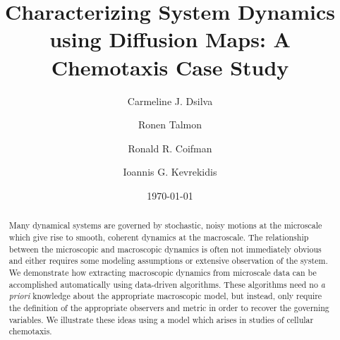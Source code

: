 \documentclass[prl, reprint, final, showkeys]{revtex4-1}
\begin{document}
\title{Characterizing System Dynamics using Diffusion Maps: A Chemotaxis Case Study}

\author{Carmeline J. Dsilva}

\author{Ronen Talmon}

\author{Ronald R. Coifman}

\author{Ioannis G. Kevrekidis}

\date{\today}

\begin{abstract}

Many dynamical systems are governed by stochastic, noisy motions at the microscale which give rise to smooth, coherent dynamics at the macroscale.
%
The relationship between the microscopic and macroscopic dynamics is often not immediately obvious and either requires some modeling assumptions or extensive observation of the system.
%
We demonstrate how extracting macroscopic dynamics from microscale data can be accomplished automatically using data-driven algorithms. 
%
These algorithms need no {\em a priori} knowledge about the appropriate macroscopic model, but instead, only require the definition of the appropriate observers and metric in order to recover the governing variables.
%
We illustrate these ideas using a model which arises in studies of cellular chemotaxis.

\end{abstract}


\maketitle

 
\end{document}
